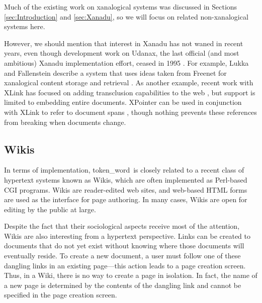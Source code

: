 \documentclass{acm_proc_article-sp}
\newcommand{\tokenWord}{token\_word}
\begin{document}
Much of the existing work on xanalogical systems was discussed in Sections \ref{sec:Introduction} and \ref{sec:Xanadu}, so we will focus on related non-xanalogical systems here.

However, we should mention that interest in Xanadu has not waned in recent years, even though development work on Udanax, the last official (and most ambitious) Xanadu implementation effort, ceased in 1995 \cite{Udanax}.
For example, Lukka and Fallenstein describe a system that uses ideas taken from Freenet for xanalogical content storage and retrieval \cite{FreenetXanadu}.
As another example, recent work with XLink has focused on adding transclusion capabilities to the web \cite{Lowe2001}, but support is limited to embedding entire documents.
XPointer can be used in conjunction with XLink to refer to document spans \cite{Vitali2002}, though nothing prevents these references from breaking when documents change.






\subsection{Wikis}

In terms of implementation, \tokenWord \  is closely related to a recent class of hypertext systems known as Wikis, which are often implemented as Perl-based CGI programs.
Wikis are reader-edited web sites, and web-based HTML forms are used as the interface for page authoring.
In many cases, Wikis are open for editing by the public at large.

Despite the fact that their sociological aspects receive most of the attention, Wikis are also interesting from a hypertext perspective.
Links can be created to documents that do not yet exist without knowing where those documents will eventually reside.
To create a new document, a user must follow one of these dangling links in an existing page---this action leads to a page creation screen.
Thus, in a Wiki, there is no way to create a page in isolation.
In fact, the name of a new page is determined by the contents of the dangling link and cannot be specified in the page creation screen.

\end{document}
